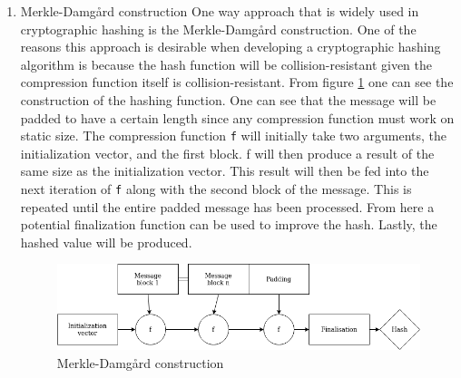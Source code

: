 \documentclass[11pt]{article}
\begin{document}
\begin{enumerate}
\item Merkle-Damgård construction
\label{sec:org6c9f164}
One way approach that is widely used in cryptographic hashing is the Merkle-Damgård construction. One of the reasons this approach is desirable when developing a cryptographic hashing algorithm is because the hash function will be collision-resistant given the compression function itself is collision-resistant.
From figure \ref{fig:Merkle} one can see the construction of the hashing function. One can see that the message will be padded to have a certain length since any compression function must work on static size. The compression function \texttt{f} will initially take two arguments, the initialization vector, and the first block. f will then produce a result of the same size as the initialization vector. This result will then be fed into the next iteration of \texttt{f} along with the second block of the message. This is repeated until the entire padded message has been processed. From here a potential finalization function can be used to improve the hash. Lastly, the hashed value will be produced.

\begin{figure}[htbp]
\centering
\includegraphics[width=.9\linewidth]{./Merkle.png}
\caption{\label{fig:Merkle}Merkle-Damgård construction}
\end{figure}
\end{enumerate}
\end{document}

